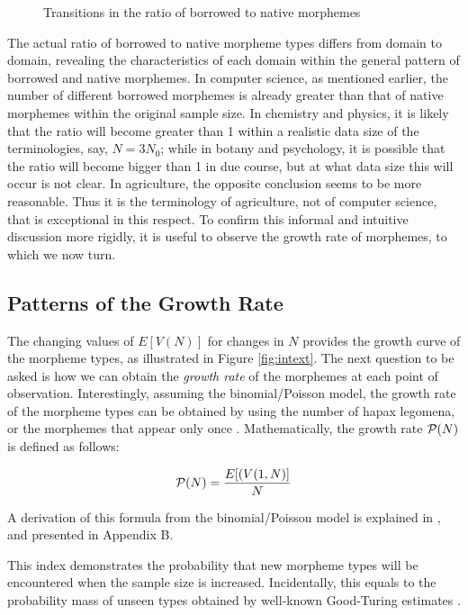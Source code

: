 \begin{figure*}[t]
\begin{center}
\leavevmode
{}
\end{center}
\caption{Transitions in the ratio of borrowed to native morphemes}
\label{fig:ratio1}
\end{figure*}

The actual ratio of borrowed to native morpheme types differs from domain
to domain, revealing the characteristics of each domain within the general
pattern of borrowed and native morphemes. In computer science, as mentioned
earlier, the number
of different borrowed morphemes is already greater than that of native
morphemes within the original sample size. In chemistry and physics, 
it is likely that the ratio will become greater than 1 within a realistic 
data size of the terminologies, say, $N=3N_0$; while in botany and
psychology, it is possible that the ratio will become bigger than 1 in due course,
but at what data size this will occur is not clear. In agriculture, 
the opposite conclusion seems to
be more reasonable. Thus it is the terminology of agriculture, not of
computer science, that is exceptional in this respect. To confirm this
informal and intuitive discussion more rigidly, it is useful to observe the
growth rate of morphemes, to which we now turn.

\subsection{Patterns of the Growth Rate}

The changing values of $E[V(N)]$ for changes in $N$ provides the growth curve of
the morpheme types, as illustrated in Figure \ref{fig:intext}. The next question
to be asked is how we can obtain the {\it growth rate} of the morphemes at
each point of observation. Interestingly, assuming the binomial/Poisson model,
the growth rate of the morpheme types can be obtained by using the number of
hapax legomena, or the morphemes that appear only once \cite{baayen91}.
Mathematically, the growth rate ${\cal P}(N)$ is defined as follows:

\begin{displaymath}
{\cal P}(N) = \frac{E[(V(1,N)]}{N}
\end{displaymath}

\noindent
A derivation of this formula from the binomial/Poisson model is explained in
\cite{baayen01}, and presented in Appendix B.

This index demonstrates the probability that new morpheme types will be encountered
when the sample size is increased. Incidentally, this equals to the
probability mass of unseen types obtained by well-known Good-Turing
estimates \cite{good53}.

